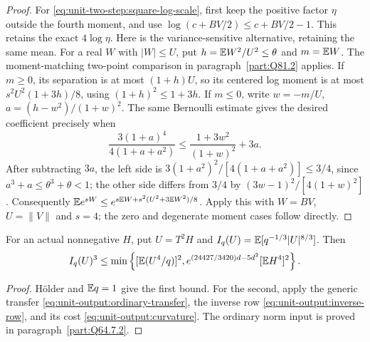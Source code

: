 \begin{proof}
For \eqref{eq:unit-two-step:square-log-scale}, first keep the
positive factor $\eta$ outside the fourth moment, and use
$\log(c+BV/2)\le c+BV/2-1$. This retains the exact $4\log\eta$.
Here is the variance-sensitive alternative, retaining the same mean.
For a real $W$ with $|W|\le U$, put
$h=\mathbb E W^2/U^2\le\theta$ and $m=\mathbb E W$. The moment-matching
two-point comparison in paragraph~\ref{part:Q81.2} applies.
If $m\ge0$, its separation is at most $(1+h)U$, so its centered
log moment is at most $s^2U^2(1+3h)/8$, using
$(1+h)^2\le1+3h$. If $m\le0$, write
$w=-m/U$, $a=(h-w^2)/(1+w)^2$. The same Bernoulli estimate gives
the desired coefficient precisely when
\[
 \frac{3(1+a)^4}{4(1+a+a^2)}
 \le\frac{1+3w^2}{(1+w)^2}+3a.
\]
After subtracting $3a$, the left side is
$3(1+a^2)^2/[4(1+a+a^2)]\le3/4$, since
$a^3+a\le\theta^3+\theta<1$; the other side differs from $3/4$
by $(3w-1)^2/[4(1+w)^2]$.
Consequently $\mathbb E e^{sW}\le
e^{s\mathbb E W+s^2(U^2+3\mathbb E W^2)/8}$.
Apply this with $W=BV$, $U=\|V\|$ and $s=4$;
the zero and degenerate moment cases follow directly.

\end{proof}

\begin{corollary}\label{cor:unit-two-step:output}
For an actual nonnegative $H$, put $U=T^2H$ and
$I_q(U)=\mathbb E[q^{-1/3}|U|^{8/3}]$. Then
\[
 I_q(U)^3\le\min\left\{
       [\mathbb E(U^4/q)]^2,
       e^{(24427/3420)d-5d^2}[\mathbb E H^4]^2\right\}.
\]
\end{corollary}
\begin{proof}
H\"older and $\mathbb E q=1$ give the first bound. For the second, apply
the generic transfer \eqref{eq:unit-output:ordinary-transfer},
the inverse row \eqref{eq:unit-output:inverse-row}, and its
cost \eqref{eq:unit-output:curvature}. The ordinary norm input
is proved in paragraph~\ref{part:Q64.7.2}.
\end{proof}

